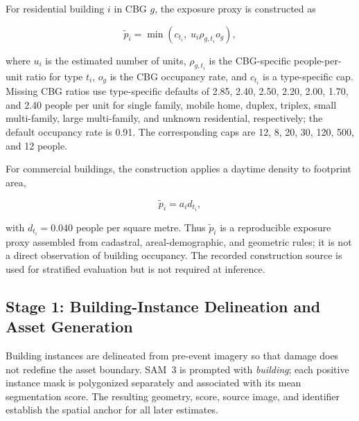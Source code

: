 For residential building $i$ in CBG $g$, the exposure proxy is constructed as

\begin{equation}
\widetilde{p}_i = \min\!\left(c_{t_i},\;u_i\rho_{g,t_i}o_g\right),
\label{eq:res_population}
\end{equation}

where $u_i$ is the estimated number of units, $\rho_{g,t_i}$ is the CBG-specific people-per-unit ratio for type $t_i$, $o_g$ is the CBG occupancy rate, and $c_{t_i}$ is a type-specific cap. Missing CBG ratios use type-specific defaults of 2.85, 2.40, 2.50, 2.20, 2.00, 1.70, and 2.40 people per unit for single family, mobile home, duplex, triplex, small multi-family, large multi-family, and unknown residential, respectively; the default occupancy rate is 0.91. The corresponding caps are 12, 8, 20, 30, 120, 500, and 12 people.

For commercial buildings, the construction applies a daytime density to footprint area,

\begin{equation}
\widetilde{p}_i = a_i d_{t_i},
\label{eq:nonres_population}
\end{equation}

with $d_{t_i}=0.040$ people per square metre. Thus $\widetilde{p}_i$ is a reproducible exposure proxy assembled from cadastral, areal-demographic, and geometric rules; it is not a direct observation of building occupancy. The recorded construction source is used for stratified evaluation but is not required at inference.

\subsection{Stage 1: Building-Instance Delineation and Asset Generation}
\label{sec:method_stage1}

Building instances are delineated from pre-event imagery so that damage does not redefine the asset boundary. SAM~3 \citep{carion2025sam3} is prompted with \emph{building}; each positive instance mask is polygonized separately and associated with its mean segmentation score. The resulting geometry, score, source image, and identifier establish the spatial anchor for all later estimates.

